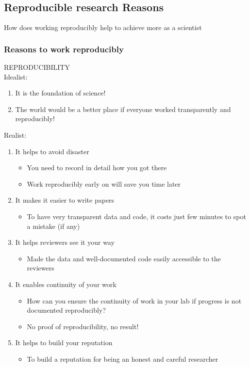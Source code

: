 \documentclass{beamer}
\begin{document}
\begin{frame}
\section{Reproducible research Reasons}
\vspace{50px}
\begin{flushright}
\scriptsize How does working reproducibly help to achieve more as a scientist \citep{Markowetz:2016cs}\\
\end{flushright}
\end{frame}

\begin{frame}
\frametitle{Reasons to work reproducibly}
\Large REPRODUCIBILITY \citep{Markowetz:2016cs}\\
Idealist:
\begin{enumerate}
\tiny
\item It is the foundation of science!
\item The world would be a better place if everyone worked transparently and reproducibly!
\end{enumerate}
\pause
Realist:
\begin{enumerate}
\footnotesize
\item It helps to avoid disaster
\begin{itemize}
\tiny
\item You need to record in detail how you got there
\item Work reproducibly early on will save you time later
\end{itemize}
\pause
\item It makes it easier to write papers
\begin{itemize}
\tiny
\item To have very transparent data and code, it costs just few minutes to spot a mistake (if any)
\end{itemize}
\pause
\item It helps reviewers see it your way
\begin{itemize}
\tiny
\item Made the data and well-documented code easily accessible to the reviewers
\end{itemize}
\pause
\item It enables continuity of your work
\begin{itemize}
\tiny
\item How can you ensure the continuity of work in your lab if progress is not documented reproducibly?
\item No proof of reproducibility, no result!
\end{itemize}
\pause
\item It helps to build your reputation
\begin{itemize}
\tiny
\item To build a reputation for being an honest and careful researcher
\end{itemize}
\end{enumerate}

\end{frame}
\end{document}

